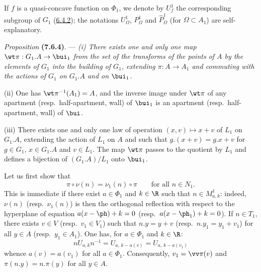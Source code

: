 \documentclass[12pt,a4paper,oneside,english]{smfart}
\makeatletter
\newcommand{\btanchor}[1]{\leavevmode\Hy@raisedlink{\hypertarget{bt:#1}{}}}
\newcommand{\btpageanchor}[1]{\Hy@raisedlink{\hypertarget{p:#1}{}}}
\newcommand{\btref}[1]{\hyperlink{bt:#1}{#1}}
\newcommand{\btpage}[1]{\marginnote{p.~#1}\btpageanchor{#1}}
\newcommand{\pg}[1]{\btpage{#1}}
\theoremstyle{definition}
\theoremstyle{bt}
\makeatother
\begin{document}
\renewcommand{\Ph}{\Phi}
\providecommand{\Om}{}
\renewcommand{\Om}{\Omega}
\providecommand{\hP}{}
\renewcommand{\hP}{\widehat{P}}
\providecommand{\hN}{}
\renewcommand{\hN}{\widehat{N}}
\providecommand{\hbui}{}
\renewcommand{\hbui}{\widehat{\bui}}
\providecommand{\dual}{}
\renewcommand{\dual}{{}^{\vee}}
\newenvironment{stmt}[2]
  {\medskip\par\noindent\textit{#1} \textbf{(#2)}. --- \itshape\ignorespaces}
  {\par\medskip}
\newenvironment{stmtup}[2]
  {\medskip\par\noindent\textit{#1} \textbf{(#2)}. --- \ignorespaces}
  {\par\medskip}
\providecommand{\numpar}{}
\renewcommand{\numpar}[1]{\medskip\par\noindent\textbf{(#1)}\ \ignorespaces}
\setlength{\parindent}{1.4em}
\allowdisplaybreaks
\bigskip

\pg{185}
\noindent
If $f$ is a quasi-concave function on $\Ph_1$, we denote by $U^1_f$ the corresponding
subgroup of $G_1$ (\btref{6.4.2}); the notations $U^1_\Om$, $P^1_\Om$ and $\hP^1_\Om$
(for $\Om\subset A_1$) are self-explanatory.

\begin{stmt}{Proposition}{7.6.4}\btanchor{7.6.4}
(i) There exists one and only one map $\wt\pi:G_1.A\to\bui_1$ from the set of the
transforms of the points of $A$ by the elements of $G_1$ into the building of $G_1$,
extending $\pi:A\to A_1$ and commuting with the actions of $G_1$ on $G_1.A$ and on
$\bui_1$.

(ii) One has $\wt\pi^{-1}(A_1)=A$, and the inverse image under $\wt\pi$ of any apartment
(resp.\ half-apartment, wall) of $\bui_1$ is an apartment (resp.\ half-apartment, wall)
of $\bui$.

(iii) There exists one and only one law of operation $(x,v)\mapsto x+v$ of $L_1$ on
$G_1.A$, extending the action of $L_1$ on $A$ and such that $g.(x+v)=g.x+v$ for
$g\in G_1$, $x\in G_1.A$ and $v\in L_1$. The map $\wt\pi$ passes to the quotient by
$L_1$ and defines a bijection of $(G_1.A)/L_1$ onto $\bui_1$.
\end{stmt}

Let us first show that
\begin{equation}\tag{1}
\pi\circ\nu(n)=\nu_1(n)\circ\pi\qquad\text{for all }n\in N_1 .
\end{equation}
This is immediate if there exist $a\in\Ph_1$ and $k\in\R$ such that $n\in M^1_{a,k}$:
indeed, $\nu(n)$ (resp.\ $\nu_1(n)$) is then the orthogonal reflection with respect to
the hyperplane of equation $a(x-\ph)+k=0$ (resp.\ $a(x-\ph_1)+k=0$). If $n\in T_1$,
there exists $v\in V$ (resp.\ $v_1\in V_1$) such that $n.y=y+v$ (resp.\ $n.y_1=y_1+v_1$)
for all $y\in A$ (resp.\ $y_1\in A_1$). One has, for $a\in\Ph_1$ and $k\in\R$:
\[
nU_{a,k}n^{-1}=U_{a,\,k-a(v)}=U_{a,\,k-a(v_1)}
\]
whence $a(v)=a(v_1)$ for all $a\in\Ph_1$. Consequently, $v_1=\vv\pi(v)$ and
$\pi(n.y)=n.\pi(y)$ for all $y\in A$.
\end{document}
